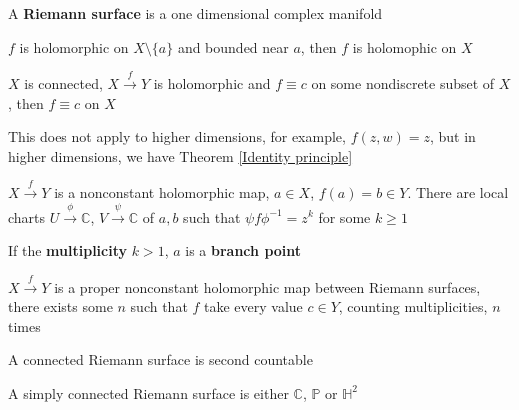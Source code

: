 \documentclass[main]{subfiles}
\begin{document}
\begin{definition}
A \textbf{Riemann surface} is a one dimensional complex manifold
\end{definition}

\begin{theorem}
$f$ is holomorphic on $X\setminus\{a\}$ and bounded near $a$, then $f$ is holomophic on $X$
\end{theorem}

\begin{theorem}
$X$ is connected, $X\xrightarrow{f}Y$ is holomorphic and $f\equiv c$ on some nondiscrete subset of $X$, then $f\equiv c$ on $X$
\end{theorem}

\begin{remark}
This does not apply to higher dimensions, for example, $f(z,w)=z$, but in higher dimensions, we have Theorem \ref{Identity principle}
\end{remark}

\begin{theorem}
$X\xrightarrow{f}Y$ is a nonconstant holomorphic map, $a\in X$, $f(a)=b\in Y$. There are local charts $U\xrightarrow{\phi}\mathbb C$, $V\xrightarrow{\psi}\mathbb C$ of $a,b$ such that $\psi f\phi^{-1}=z^k$ for some $k\geq1$
\end{theorem}

\begin{remark}
If the \textbf{multiplicity} $k>1$, $a$ is a \textbf{branch point}
\end{remark}

\begin{theorem}
$X\xrightarrow{f}Y$ is a proper nonconstant holomorphic map between Riemann surfaces, there exists some $n$ such that $f$ take every value $c\in Y$, counting multiplicities, $n$ times
\end{theorem}

\begin{theorem}
A connected Riemann surface is second countable
\end{theorem}

\begin{theorem}\label{Uniformization theorem}
A simply connected Riemann surface is either $\mathbb C$, $\mathbb P$ or $\mathbb H^2$
\end{theorem}
\end{document}
